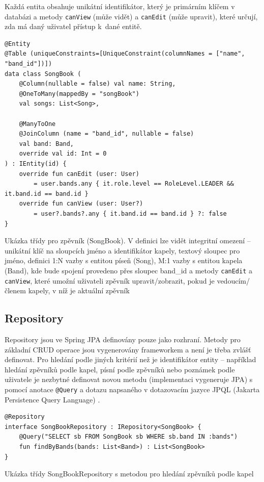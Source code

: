 Každá entita obsahuje unikátní identifikátor, který je primárním klíčem v databázi a metody \texttt{canView} (může vidět) a \texttt{canEdit} (může upravit), které určují, zda má daný uživatel přístup k~dané entitě.

\begin{listing}
\begin{verbatim}
@Entity
@Table (uniqueConstraints=[UniqueConstraint(columnNames = ["name", "band_id"])])
data class SongBook (
    @Column(nullable = false) val name: String,
    @OneToMany(mappedBy = "songBook")
    val songs: List<Song>,

    @ManyToOne
    @JoinColumn (name = "band_id", nullable = false)
    val band: Band,
    override val id: Int = 0
) : IEntity(id) {
    override fun canEdit (user: User)
        = user.bands.any { it.role.level == RoleLevel.LEADER && it.band.id == band.id }
    override fun canView (user: User?)
        = user?.bands?.any { it.band.id == band.id } ?: false
}
\end{verbatim}
\caption[Ukázka třídy pro zpěvník]{Ukázka třídy pro zpěvník (SongBook). V definici lze vidět integritní omezení -- unikátní klíč na sloupcích jméno a identifikátor kapely, textový sloupec pro jméno, definici 1:N vazby s entitou píseň (Song), M:1 vazby s entitou kapela (Band), kde bude spojení provedeno přes sloupec band\_id a metody \texttt{canEdit} a \texttt{canView}, které umožní uživateli zpěvník upravit/zobrazit, pokud je vedoucím/členem kapely, v níž je aktuální zpěvník}
\end{listing}

\subsection{Repository}

Repository jsou ve Spring JPA definovány pouze jako rozhraní. Metody pro základní CRUD operace jsou vygenerovány frameworkem a není je třeba zvlášť definovat. Pro hledání podle jiných kritérií než je identifikátor entity -- například hledání zpěvníků podle kapel, písní podle zpěvníků nebo poznámek podle uživatele je nezbytné definovat novou metodu (implementaci vygeneruje JPA) s pomocí anotace \texttt{@Query} a dotazu napsaného v dotazovacím jazyce JPQL (Jakarta Persistence Query Language) \cite{jpql}.

\begin{listing}[H]
\begin{verbatim}
@Repository
interface SongBookRepository : IRepository<SongBook> {
    @Query("SELECT sb FROM SongBook sb WHERE sb.band IN :bands")
    fun findByBands(bands: List<Band>) : List<SongBook>
}
\end{verbatim}
\caption[Ukázka třídy Repository pro zpěvník]{Ukázka třídy SongBookRepository s metodou pro hledání zpěvníků podle kapel}
\end{listing}

